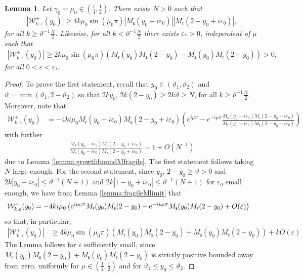 \documentclass[11pt,reqno]{amsproc}
\newtheorem{lemma}[proposition]{Lemma}
\theoremstyle{definition}
\numberwithin{equation}{section}
\newcommand{\sr}{{\mathsf{r}}}
\newcommand{\s}{{\mathsf{s}}}
\newcommand{\W}{{\mathcal{W}}}
\newcommand{\ep}{\varepsilon}
\newcommand\e{{\rm e}}
\begin{document}
\begin{lemma}\label{lemma:Wronskianlowerboundweakstrat}
Let $\gamma_0=\mu_0\in \left( \frac14, \frac12 \right)$. There exists $N>0$ such that
\begin{align*}
\left| \W_{k,\ep}^+(y_0) \right| \geq 4k\mu_0\sin(\mu_0\pi)|M_\s(y_0-i\ep_0)||M_\sr(2-y_0+i\ep_0)|,
\end{align*}
for all $k \geq \vartheta^{-1}\frac{N}{2}$. Likewise, for all $k < \vartheta^{-1}\frac{N}{2}$ there exists $\varepsilon_*>0$, independent of $\mu$ such that 
\begin{align*}
\left| \W_{k,\ep}^+(y_0)\right| \geq 2 k \mu_0\sin(\mu_0\pi) \left( M_\sr(y_0) M_\s(2-y_0) - M_\s(y_0) M_\sr(2-y_0) \right) > 0,
\end{align*}
for all $0< \ep < \ep_*$.
\end{lemma}

\begin{proof}
To prove the first statement, recall that $y_0\in (\vartheta_1,\vartheta_2)$ and $\vartheta=\min(\vartheta_1,2-\vartheta_2)$ so that $2k y_0, \, 2k(2-y_0) \geq 2k\vartheta \geq N$, for all $k \geq \vartheta^{-1}\frac{N}{2}$. Moreover, note that 
\begin{align*}
\W_{k,\ep}^+(y_0)&=-4ki\mu_0 M_\sr(y_0-i\ep_0)M_\s(2-y_0+i\ep_0) \left( e^{i\mu\pi}-e^{-i\mu\pi}\frac{M_\s(y_0-i\ep_0)M_\sr(2-y_0+i\ep_0)}{M_\sr(y_0-i\ep_0)M_\s(2-y_0+i\ep_0)} \right)
\end{align*}
with further 
\begin{align*}
\frac{M_\s(y_0-i\ep_0)M_\sr(2-y_0+i\ep_0)}{M_\sr(y_0-i\ep_0)M_\s(2-y_0+i\ep_0)} = 1 + O(N^{-1})
\end{align*}
due to Lemma \ref{lemma:growthboundMfragile}. The first statement follows taking $N$ large enough. For the second statement, since $y_0,\, 2-y_0\geq \vartheta>0$ and $2k|y_0-i\ep_0|\leq \vartheta^{-1}(N+1)$ and $2k|1-y_0+i\ep_0|\leq \vartheta^{-1}(N+1)$ for $\ep_0$ small enough, we have from Lemma \ref{lemma:fragileMlimit} that
\begin{align*}
\W_{k,\ep}^+(y_0)&=-4ki\mu_0\left( \e^{i\mu_0\pi}M_\sr(y_0)M_\s(2-y_0)-\e^{-i\mu_0\pi}M_\s(y_0)M_\sr(2-y_0) + O(\ep)  \right) 
\end{align*}
so that, in particular,
\begin{align*}
\left| \W_{k,\ep}^+(y_0) \right| &\geq 4k\mu_0\sin(\mu_0\pi)\left( M_\sr(y_0)M_\s(2-y_0)+M_\s(y_0)M_\sr(2-y_0) \right) + kO(\ep)  
\end{align*}
The Lemma follows for $\ep$ sufficiently small, since $M_\sr(y_0)M_\s(2-y_0)+M_\s(y_0)M_\sr(2-y_0)$ is strictly positive bounded away from zero, uniformly for $\mu \in \left( \frac14,\frac12 \right)$ and for $\vartheta_1 \leq y_0 \leq \vartheta_2$. 
\end{proof}
\end{document}
